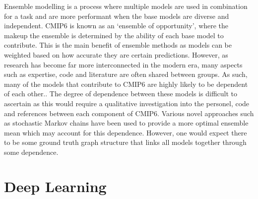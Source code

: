 \documentclass[honours,12pt]{unswthesis}
\numberwithin{equation}{section}
\begin{document}
{\noindent} Ensemble modelling is a process where multiple models are used in combination for a task and are more performant when the base models are diverse and independent\cite{KOTU201919}.
CMIP6 is known as an `ensemble of opportunity'\cite{Knutti2010}, where the makeup the ensemble is determined by the ability of each base model to contribute.\cite{ClimateModelDependenceandtheEnsembleDependenceTransformationofCMIPProjections}
This is the main benefit of ensemble methods as models can be weighted based on how accurate they are certain predictions.
However, as research has become far more interconnected in the modern era, many aspects such as expertise, code and literature are often shared between groups. 
As such, many of the models that contribute to CMIP6 are highly likely to be dependent of each other.\cite{ClimateModelDependenceandtheEnsembleDependenceTransformationofCMIPProjections}. 
The degree of dependence between these models is difficult to ascertain as this would require a qualitative investigation into the personel, code and references between each component of CMIP6.
Various novel approaches such as stochastic Markov chains\cite{Kulinich_2022} have been used to provide a more optimal ensemble mean which may account for this dependence.
However, one would expect there to be some ground truth graph structure that links all models together through some dependence.

{\section{Deep Learning}}\label{deep-learning}
\end{document}
